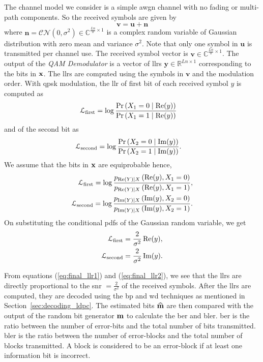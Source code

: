 The channel model we consider is a simple \ac{awgn} channel with no fading or multi-path components. So the received symbols are given by $$\mathbf{v}=\mathbf{u}+\mathbf{n}$$where $\mathbf{n}=\mathcal{CN}(0,\sigma^2)\in\mathbb{C}^{\frac{Ln}{o}\times 1}$ is a complex random variable of Gaussian distribution with zero mean and variance $\sigma^2$. Note that only one symbol in $\mathbf{u}$ is transmitted per channel use. The received symbol vector is $\mathbf{v}\in\mathbb{C}^{\frac{Ln}{o}\times 1}$. The output of the \emph{QAM Demodulator} is a vector of \acp{llr} $\mathbf{y}\in\mathbb{R}^{Ln\times 1}$ corresponding to the bits in $\mathbf{x}$. The \acp{llr} are computed using the symbols in $\mathbf{v}$ and the modulation order. With \ac{qpsk} modulation, the \ac{llr} of first bit of each received symbol $y$ is computed as
\begin{align}
\mathcal{L}_{\text{first}}&=\log\frac{\text{Pr}\left(X_1=0\mid\operatorname{Re}(y)\right)}{\text{Pr}\left(X_1=1\mid\operatorname{Re}(y)\right)}
\end{align}
and of the second bit as
\begin{align}
\mathcal{L}_{\text{second}}&=\log\frac{\text{Pr}\left(X_2=0\mid\operatorname{Im}(y)\right)}{\text{Pr}\left(X_2=1\mid\operatorname{Im}(y)\right)}.
\end{align}
We assume that the bits in $\mathbf{x}$ are equiprobable hence,
\begin{align}
\mathcal{L}_{\text{first}}=\log\frac{p_{\operatorname{Re}(Y)\mid X}\left(\operatorname{Re}(y), X_1=0\right)}{p_{\operatorname{Re}(Y)\mid X}\left(\operatorname{Re}(y), X_1=1\right)},\\
\mathcal{L}_{\text{second}}=\log\frac{p_{\operatorname{Im}(Y)\mid X}\left(\operatorname{Im}(y), X_2=0\right)}{p_{\operatorname{Im}(Y)\mid X}\left(\operatorname{Im}(y), X_2=1\right)}.
\end{align}
On substituting the conditional \acp{pdf} of the Gaussian random variable, we get
\begin{align}
\mathcal{L}_{\text{first}}&=\frac{2}{\sigma^2}\operatorname{Re}(y)\label{eq:final_llr1},\\
\mathcal{L}_{\text{second}}&=\frac{2}{\sigma^2}\operatorname{Im}(y)\label{eq:final_llr2}.
\end{align}

From equations (\ref{eq:final_llr1}) and (\ref{eq:final_llr2}), we see that the \acp{llr} are directly proportional to the \ac{snr} $=\frac{2}{\sigma^2}$ of the received symbols. After the \acp{llr} are computed, they are decoded using the \ac{bp} and \ac{wd} techniques as mentioned in Section~\ref{sec:decoding_ldpc}. The estimated bits $\widehat{\mathbf{m}}$ are then compared with the output of the random bit generator $\mathbf{m}$ to calculate the \ac{ber} and \ac{bler}. \ac{ber} is the ratio between the number of error-bits and the total number of bits transmitted. \ac{bler} is the ratio between the number of error-blocks and the total number of blocks transmitted. A block is considered to be an error-block if at least one information bit is incorrect.
